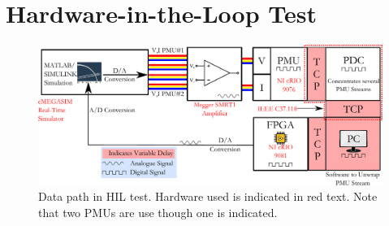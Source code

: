 \documentclass[conference]{IEEEtran}
\begin{document}
\section{Hardware-in-the-Loop Test} \label{HILtest}

\begin{figure}[!ht]
\centering
\includegraphics[width=5.5in]{DelaySources.pdf} 
\caption{Data path in HIL test. Hardware used is indicated in {\color{red}red} text. Note that two PMUs are use though one is indicated.}
\label{ExperimentOutline}
\end{figure}
\end{document}
